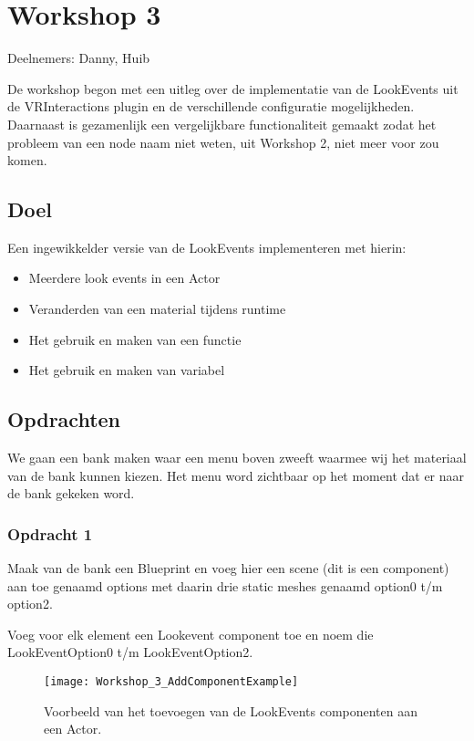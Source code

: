 
\chapter{Workshop 3}
\lhead{}
Deelnemers: Danny, Huib

De workshop begon met een uitleg over de implementatie van de LookEvents uit de VRInteractions plugin en de verschillende configuratie mogelijkheden. Daarnaast is gezamenlijk een vergelijkbare functionaliteit gemaakt zodat het probleem van een node naam niet weten, uit Workshop 2, niet meer voor zou komen.

\section{Doel}
Een ingewikkelder versie van de LookEvents implementeren met hierin:

\begin{itemize}
	\item Meerdere look events in een Actor
	\item Veranderden van een material tijdens runtime
	\item Het gebruik en maken van een functie
	\item Het gebruik en maken van variabel
\end{itemize}

\section{Opdrachten}

We gaan een bank maken waar een menu boven zweeft waarmee wij het materiaal van de bank kunnen kiezen. Het menu word zichtbaar op het moment dat er naar de bank gekeken word.

\subsection{Opdracht 1}
Maak van de bank een Blueprint en voeg hier een scene (dit is een component) aan toe genaamd options met daarin drie static meshes genaamd option0 t/m option2.

Voeg voor elk element een Lookevent component toe en noem die LookEventOption0 t/m LookEventOption2.

\begin{figure}[!ht]
  \centering
    \texttt{[image: Workshop\_3\_AddComponentExample]}
    \caption{Voorbeeld van het toevoegen van de LookEvents componenten aan een Actor.}
\end{figure}

